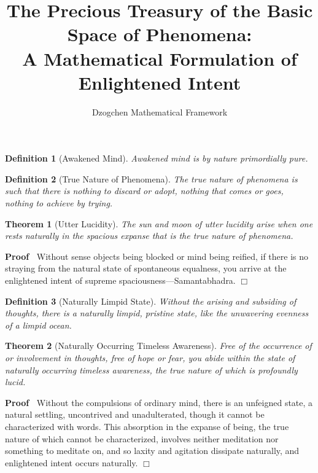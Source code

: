 \documentclass{article}
\newenvironment{proof}{\noindent\textbf{Proof\ }}{\hspace*{\fill}$\Box$\medskip}
\newtheorem{definition}{Definition}
\newtheorem{theorem}{Theorem}
\begin{document}
\title{
  The Precious Treasury of the Basic Space of Phenomena:\\
  A Mathematical Formulation of Enlightened Intent
}

\author{Dzogchen Mathematical Framework}

\date{}

\maketitle

\begin{definition}
  [Awakened Mind] Awakened mind is by nature primordially pure.
\end{definition}

\begin{definition}
  [True Nature of Phenomena] The true nature of phenomena is such that there
  is nothing to discard or adopt, nothing that comes or goes, nothing to
  achieve by trying.
\end{definition}

\begin{theorem}
  [Utter Lucidity] The sun and moon of utter lucidity arise when one rests
  naturally in the spacious expanse that is the true nature of phenomena.
\end{theorem}

\begin{proof}
  Without sense objects being blocked or mind being reified, if there is no
  straying from the natural state of spontaneous equalness, you arrive at the
  enlightened intent of supreme spaciousness---Samantabhadra.
\end{proof}

\begin{definition}
  [Naturally Limpid State] Without the arising and subsiding of thoughts,
  there is a naturally limpid, pristine state, like the unwavering evenness of
  a limpid ocean.
\end{definition}

\begin{theorem}
  [Naturally Occurring Timeless Awareness] Free of the occurrence of or
  involvement in thoughts, free of hope or fear, you abide within the state of
  naturally occurring timeless awareness, the true nature of which is
  profoundly lucid.
\end{theorem}

\begin{proof}
  Without the compulsions of ordinary mind, there is an unfeigned state, a
  natural settling, uncontrived and unadulterated, though it cannot be
  characterized with words. This absorption in the expanse of being, the true
  nature of which cannot be characterized, involves neither meditation nor
  something to meditate on, and so laxity and agitation dissipate naturally,
  and enlightened intent occurs naturally.
\end{proof}
\end{document}
